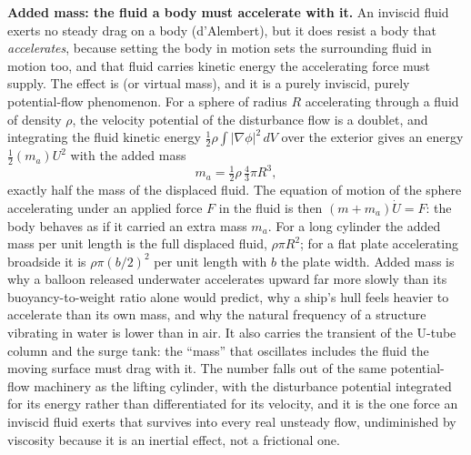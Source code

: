 \begin{mastery}
\textbf{Added mass: the fluid a body must accelerate with it.} An
inviscid fluid exerts no steady drag on a body (d'Alembert), but it
does resist a body that \emph{accelerates}, because setting the body in
motion sets the surrounding fluid in motion too, and that fluid carries
kinetic energy the accelerating force must supply. The effect is
 (or virtual mass), and it is a purely inviscid,
purely potential-flow phenomenon. For a sphere of radius $R$
accelerating through a fluid of density $\rho$, the velocity potential
of the disturbance flow is a doublet, and integrating the fluid kinetic
energy $\tfrac12\rho\int|\nabla\phi|^2\,dV$ over the exterior gives an
energy $\tfrac12(m_a)U^2$ with the added mass
\[
m_a = \tfrac12\rho\,\tfrac43\pi R^3,
\]
exactly half the mass of the displaced fluid. The equation of motion
of the sphere accelerating under an applied force $F$ in the fluid is
then $(m + m_a)\dot U = F$: the body behaves as if it carried an extra
mass $m_a$. For a long cylinder the added mass per unit length is the
full displaced fluid, $\rho\pi R^2$; for a flat plate accelerating
broadside it is $\rho\pi(b/2)^2$ per unit length with $b$ the plate
width. Added mass is why a balloon released underwater accelerates
upward far more slowly than its buoyancy-to-weight ratio alone would
predict, why a ship's hull feels heavier to accelerate than its own
mass, and why the natural frequency of a structure vibrating in water
is lower than in air. It also carries the transient of the U-tube
column and the surge tank: the ``mass'' that oscillates includes the
fluid the moving surface must drag with it. The number falls out of the
same potential-flow machinery as the lifting cylinder, with the
disturbance potential integrated for its energy rather than
differentiated for its velocity, and it is the one force an inviscid
fluid exerts that survives into every real unsteady flow, undiminished
by viscosity because it is an inertial effect, not a frictional one.
\end{mastery}

